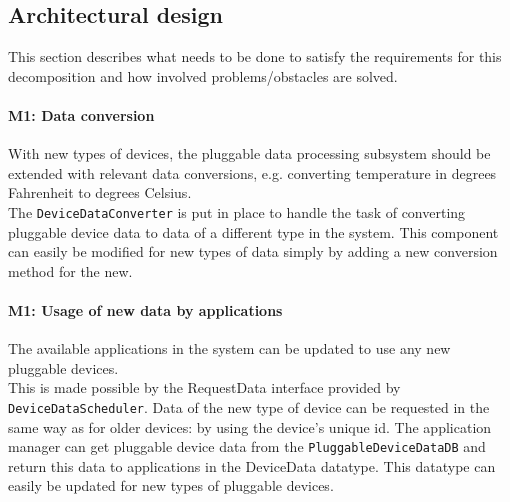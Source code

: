 \subsection{Architectural design}
    This section describes what needs to be done to satisfy the requirements for
    this decomposition and how involved problems/obstacles are solved.

    \paragraph{M1: Data conversion}
        With new types of devices, the pluggable data processing subsystem
        should be extended with relevant data conversions,
        e.g. converting temperature in degrees Fahrenheit to degrees Celsius. \\
        The \texttt{DeviceDataConverter} is put in place to handle the
        task of converting pluggable device data to data of a different type in the system.
        This component can easily be modified for new types of data simply by
        adding a new conversion method for the new.

    \paragraph{M1: Usage of new data by applications}
        The available applications in the system can be updated to use any
        new pluggable devices. \\
        This is made possible by the RequestData
        interface provided by \texttt{DeviceDataScheduler}.
        Data of the new type of device can be requested in the same way
        as for older devices: by using the device's unique id.
        The application manager can get pluggable device data from the
        \texttt{PluggableDeviceDataDB} and return this data to applications in
        the DeviceData datatype. This datatype can easily be
        updated for new types of pluggable devices.

